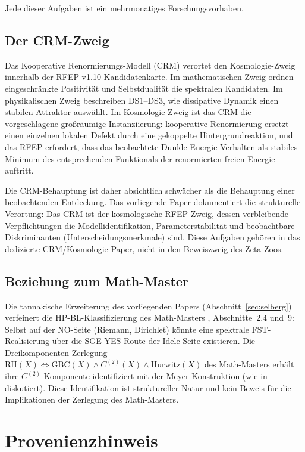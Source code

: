 \documentclass[11pt,a4paper]{article}
\theoremstyle{plain}
\theoremstyle{definition}
\begin{document}
Jede dieser Aufgaben ist ein mehrmonatiges Forschungsvorhaben.

\subsection{Der CRM-Zweig}

Das Kooperative Renormierungs-Modell (CRM) verortet den
Kosmologie-Zweig innerhalb der RFEP-v1.10-Kandidatenkarte. Im mathematischen Zweig ordnen eingeschränkte Positivität
und Selbstdualität die spektralen Kandidaten. Im physikalischen Zweig
beschreiben DS1--DS3, wie dissipative Dynamik einen stabilen Attraktor auswählt.
Im Kosmologie-Zweig ist das CRM die vorgeschlagene großräumige
Instanziierung: kooperative Renormierung ersetzt einen einzelnen lokalen Defekt
durch eine gekoppelte Hintergrundreaktion, und das RFEP erfordert, dass das
beobachtete Dunkle-Energie-Verhalten als stabiles Minimum des entsprechenden
Funktionals der renormierten freien Energie auftritt.

Die CRM-Behauptung ist daher absichtlich schwächer als die Behauptung
einer beobachtenden Entdeckung. Das vorliegende Paper dokumentiert
die strukturelle Verortung: Das CRM ist der kosmologische RFEP-Zweig,
dessen verbleibende Verpflichtungen die Modellidentifikation, Parameterstabilität
und beobachtbare Diskriminanten (Unterscheidungsmerkmale) sind. Diese Aufgaben
gehören in das dedizierte CRM/Kosmologie-Paper, nicht in den Beweiszweig des Zeta Zoos.

\subsection{Beziehung zum Math-Master}

Die tannakische Erweiterung des vorliegenden Papers (Abschnitt~\ref{sec:selberg})
verfeinert die HP-BL-Klassifizierung des Math-Masters \cite{MathMaster},
Abschnitte~2.4 und~9: Selbst auf der NO-Seite (Riemann, Dirichlet) könnte eine spektrale
FST-Realisierung über die SGE-YES-Route der Idele-Seite existieren. Die
Dreikomponenten-Zerlegung $\mathrm{RH}(X) \iff \mathrm{GBC}(X) \wedge C^{(2)}(X) \wedge \mathrm{Hurwitz}(X)$
des Math-Masters erhält ihre $C^{(2)}$-Komponente identifiziert mit der
Meyer-Konstruktion (wie in \cite{C2LayerStatus} diskutiert). Diese Identifikation ist
struktureller Natur und kein Beweis für die Implikationen der Zerlegung des Math-Masters.

\section*{Provenienzhinweis}
\end{document}
